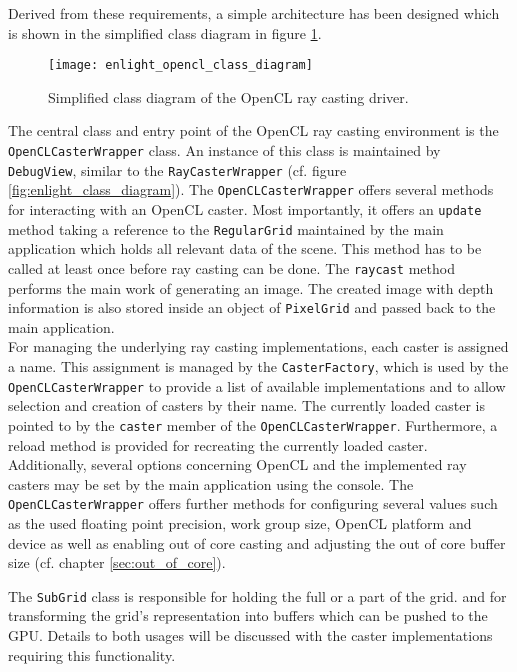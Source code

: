 Derived from these requirements, a simple architecture has been designed which is shown in the simplified class diagram in figure \ref{fig:enlight_opencl_class_diagram}.

\begin{figure}
\centering
\texttt{[image: enlight\_opencl\_class\_diagram]}
\caption{Simplified class diagram of the OpenCL ray casting driver.}
\label{fig:enlight_opencl_class_diagram}
\end{figure}

The central class and entry point of the OpenCL ray casting environment is the \lstinline!OpenCLCasterWrapper! class. An instance of this class is maintained by \lstinline!DebugView!, similar to the \lstinline!RayCasterWrapper! (cf. figure \ref{fig:enlight_class_diagram}). The \lstinline!OpenCLCasterWrapper! offers several methods for interacting with an OpenCL caster. Most importantly, it offers an \lstinline!update! method taking a reference to the \lstinline!RegularGrid! maintained by the main application which holds all relevant data of the scene. This method has to be called at least once before ray casting can be done. The \lstinline!raycast! method performs the main work of generating an image. The created image with depth information is also stored inside an object of \lstinline!PixelGrid! and passed back to the main application. \\
For managing the underlying ray casting implementations, each caster is assigned a name. This assignment is managed by the \lstinline!CasterFactory!, which is used by the \lstinline!OpenCLCasterWrapper! to provide a list of available implementations and to allow selection and creation of casters by their name. The currently loaded caster is pointed to by the \lstinline!caster! member of the \lstinline!OpenCLCasterWrapper!. Furthermore, a reload method is provided for recreating the currently loaded caster. \\
Additionally, several options concerning OpenCL and the implemented ray casters may be set by the main application using the console. The \lstinline!OpenCLCasterWrapper! offers further methods for configuring several values such as the used floating point precision, work group size, OpenCL platform and device as well as enabling out of core casting and adjusting the out of core buffer size (cf. chapter \ref{sec:out_of_core}).

The \lstinline!SubGrid! class is responsible for holding the full or a part of the grid. and for transforming the grid's representation into buffers which can be pushed to the GPU. Details to both usages will be discussed with the caster implementations requiring this functionality.

